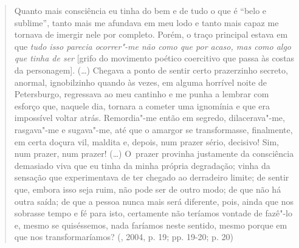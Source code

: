 \begin{quote}
Quanto mais consciência eu tinha do bem e de tudo o que é ``belo e
sublime'', tanto mais me afundava em meu lodo e tanto mais capaz me
tornava de imergir nele por completo. Porém, o traço principal estava em
que \emph{tudo isso parecia ocorrer"-me não como que por acaso, mas como
algo que tinha de ser} {[}grifo do movimento poético coercitivo que
passa às costas da personagem{]}. (\ldots) Chegava a ponto de sentir certo
prazerzinho secreto, anormal, ignobilzinho quando às vezes, em alguma
horrível noite de Petersburgo, regressava ao meu cantinho e me punha a
lembrar com esforço que, naquele dia, tornara a cometer uma ignomínia e
que era impossível voltar atrás. Remordia"-me então em segredo,
dilacerava"-me, rasgava"-me e sugava"-me, até que o amargor se
transformasse, finalmente, em certa doçura vil, maldita e, depois, num
prazer sério, decisivo! Sim, num prazer, num prazer! (\ldots) O~prazer
provinha justamente da consciência demasiado viva que eu tinha da minha
própria degradação; vinha da sensação que experimentava de ter chegado
ao derradeiro limite; de sentir que, embora isso seja ruim, não pode ser
de outro modo; de que não há outra saída; de que a pessoa nunca mais
será diferente, pois, ainda que nos sobrasse tempo e fé para isto,
certamente não teríamos vontade de fazê"-lo e, mesmo se quiséssemos, nada
faríamos neste sentido, mesmo porque em que nos transformaríamos?
(, 2004, p. 19; pp. 19-20; p. 20)
\end{quote}

